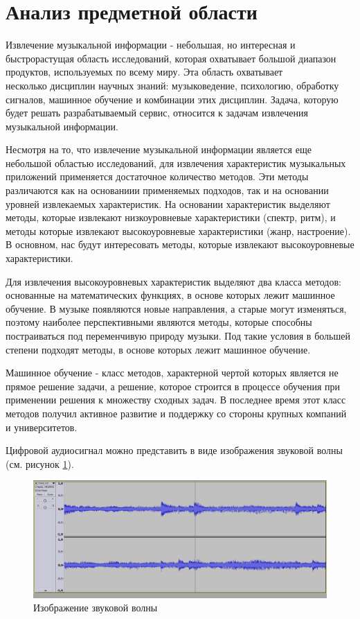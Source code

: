 \section{Анализ предметной области}
\label{sec:analysis}

Извлечение музыкальной информации - небольшая, но интересная и быстрорастущая область исследований, которая охватывает большой диапазон продуктов, используемых по всему миру. Эта область охватывает \\несколько дисциплин научных знаний: музыковедение, психологию, обработку сигналов, машинное обучение и комбинации этих дисциплин. Задача, которую будет решать разрабатываемый сервис, относится к задачам извлечения музыкальной информации.

Несмотря на то, что извлечение музыкальной информации является еще небольшой областью исследований, для извлечения характеристик музыкальных приложений применяется достаточное количество методов. Эти методы различаются как на основаниии применяемых подходов, так и на основании уровней извлекаемых характеристик. На основании характеристик выделяют методы, которые извлекают низкоуровневые характеристики (спектр, ритм), и методы которые извлекают высокоуровневые характеристики (жанр, настроение). В основном, нас будут интересовать методы, которые извлекают высокоуровневые характеристики.

Для извлечения высокоуровневых характеристик выделяют два класса методов: основанные на математических функциях, в основе которых лежит машинное обучение. В музыке появляются новые направления, а старые могут изменяться, поэтому наиболее перспективными являются методы, которые способны постраиваться под переменчивую природу музыки. Под такие условия в большей степени подходят методы, в основе которых лежит машинное обучение.

Машинное обучение - класс методов, характерной чертой которых является не прямое решение задачи, а решение, которое строится в процессе обучения при применении решения к множеству сходных задач. В последнее время этот класс методов получил активное развитие и поддержку со стороны крупных компаний и университетов.

Цифровой аудиосигнал можно представить в виде изображения звуковой волны (см. рисунок \ref{sec:analysus:sound_wave}).

\begin{figure}[t]
\centering
	\includegraphics[scale=0.14]{attachments/sound_vawe.png}
	\caption{Изображение звуковой волны}
	\label{sec:analysus:sound_wave}
\end{figure}


